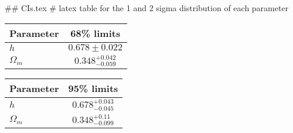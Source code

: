 ## CIs.tex
# latex table for the 1 and 2 sigma distribution of each parameter

\begin{tabular} { l  c}
 Parameter &  68\% limits\\
\hline
{\boldmath$h              $} & $0.678\pm 0.022            $\\
{\boldmath$\Omega_m       $} & $0.348^{+0.042}_{-0.059}   $\\
\hline
\end{tabular}

\begin{tabular} { l  c}
 Parameter &  95\% limits\\
\hline
{\boldmath$h              $} & $0.678^{+0.043}_{-0.045}   $\\
{\boldmath$\Omega_m       $} & $0.348^{+0.11}_{-0.099}    $\\
\hline
\end{tabular}

